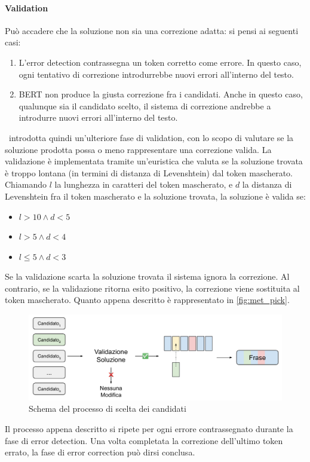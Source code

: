 \paragraph{Validation}
Può accadere che la soluzione non sia una correzione adatta: si pensi ai seguenti casi:
\begin{enumerate}
\item L'error detection contrassegna un token corretto come errore. In questo caso, ogni tentativo di correzione introdurrebbe nuovi errori all'interno del testo.
\item BERT non produce la giusta correzione fra i candidati. Anche in questo caso, qualunque sia il candidato scelto, il sistema di correzione andrebbe a introdurre nuovi errori all'interno del testo.
\end{enumerate}

\E\ introdotta quindi un'ulteriore fase di validation, con lo scopo di valutare se la soluzione prodotta possa o meno rappresentare una correzione valida. La validazione è implementata tramite un'euristica che valuta se la soluzione trovata è troppo lontana (in termini di distanza di Levenshtein) dal token mascherato. Chiamando $l$ la lunghezza in caratteri del token mascherato, e $d$ la distanza di Levenshtein fra il token mascherato e la soluzione trovata, la soluzione è valida se:
\begin{itemize}
\item $l > 10 \wedge d < 5$ 
\item $l > 5 \wedge d < 4$ 
\item $l \leqslant 5 \wedge d < 3$ 
\end{itemize}
Se la validazione scarta la soluzione trovata il sistema ignora la correzione. Al contrario, se la validazione ritorna esito positivo, la correzione viene sostituita al token mascherato. Quanto appena descritto è rappresentato in \autoref{fig:met_pick}.

\begin{figure}[H]
\centering
\includegraphics[width=\textwidth]{immagini/metodologia/scelta_candidati}
\caption{Schema del processo di scelta dei candidati}
\label{fig:met_pick}
\end{figure}
Il processo appena descritto si ripete per ogni errore contrassegnato durante la fase di error detection. Una volta completata la correzione dell'ultimo token errato, la fase di error correction può dirsi conclusa.

